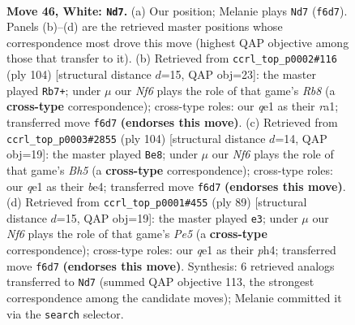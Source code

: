 \documentclass[11pt]{article}
\begin{document}
\clearpage

\begin{figure}[p]\centering
\begin{subfigure}{0.46\textwidth}\centering
\resizebox{\linewidth}{!}{%
\newchessgame
\chessboard[
  setfen={7k/8/5N2/8/2p2P2/1pP5/1K6/4q3 w - - 0 46},
  showmover=false,
  pgfstyle=straightmove, color=movearrow, markmove={f6-d7}
]}
\caption{}
\end{subfigure}\hfill
\begin{subfigure}{0.46\textwidth}\centering
\resizebox{\linewidth}{!}{%
\newchessgame
\chessboard[
  setfen={1R6/7k/5Kp1/P6p/8/5P2/8/r7 w - - 7 53},
  showmover=false,
  pgfstyle=straightmove, color=movearrow, markmove={b8-b7}
]}
\caption{}
\end{subfigure}
\\[4pt]
\begin{subfigure}{0.46\textwidth}\centering
\resizebox{\linewidth}{!}{%
\newchessgame
\chessboard[
  setfen={8/P7/1k6/2p3pB/2K1b3/6P1/8/8 w - - 17 53},
  showmover=false,
  pgfstyle=straightmove, color=movearrow, markmove={h5-e8}
]}
\caption{}
\end{subfigure}\hfill
\begin{subfigure}{0.46\textwidth}\centering
\resizebox{\linewidth}{!}{%
\newchessgame
\chessboard[
  setfen={8/7p/2k3p1/2P5/2K1p2P/6P1/8/8 b - - 1 45},
  showmover=false,
  pgfstyle=straightmove, color=movearrow, markmove={e4-e3}
]}
\caption{}
\end{subfigure}
\caption{\textbf{Move 46, White: \texttt{Nd7}.} (a) Our position; Melanie plays \texttt{Nd7} (\texttt{f6d7}). Panels (b)--(d) are the retrieved master positions whose correspondence most drove this move (highest QAP objective among those that transfer to it). (b) Retrieved from \texttt{ccrl\_top\_p0002\#116} (ply 104) [structural distance $d$=15, QAP obj=23]: the master played \texttt{Rb7+}; under $\mu$ our \emph{Nf6} plays the role of that game's \emph{Rb8} (a \textbf{cross-type} correspondence); cross-type roles: our \emph{q}e1 as their \emph{r}a1; transferred move \texttt{f6d7} \textbf{(endorses this move)}. (c) Retrieved from \texttt{ccrl\_top\_p0003\#2855} (ply 104) [structural distance $d$=14, QAP obj=19]: the master played \texttt{Be8}; under $\mu$ our \emph{Nf6} plays the role of that game's \emph{Bh5} (a \textbf{cross-type} correspondence); cross-type roles: our \emph{q}e1 as their \emph{b}e4; transferred move \texttt{f6d7} \textbf{(endorses this move)}. (d) Retrieved from \texttt{ccrl\_top\_p0001\#455} (ply 89) [structural distance $d$=15, QAP obj=19]: the master played \texttt{e3}; under $\mu$ our \emph{Nf6} plays the role of that game's \emph{Pe5} (a \textbf{cross-type} correspondence); cross-type roles: our \emph{q}e1 as their \emph{p}h4; transferred move \texttt{f6d7} \textbf{(endorses this move)}. Synthesis: 6 retrieved analogs transferred to \texttt{Nd7} (summed QAP objective 113, the strongest correspondence among the candidate moves); Melanie committed it via the \texttt{search} selector.}
\label{fig:thought-m90}
\end{figure}
\end{document}
